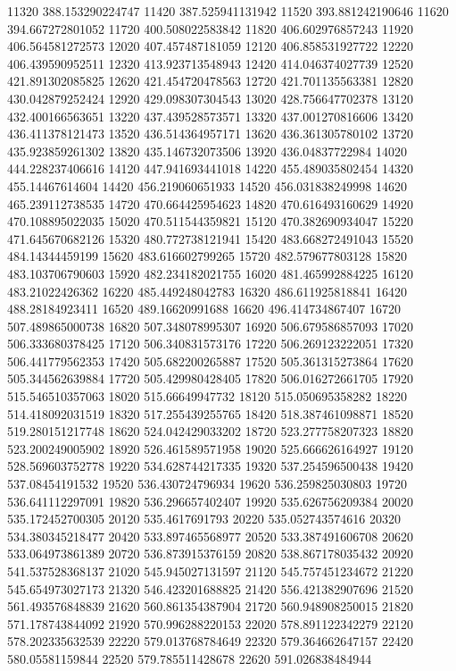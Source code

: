 {11320 388.153290224747
11420 387.525941131942
11520 393.881242190646
11620 394.667272801052
11720 400.508022583842
11820 406.602976857243
11920 406.564581272573
12020 407.457487181059
12120 406.858531927722
12220 406.439590952511
12320 413.923713548943
12420 414.046374027739
12520 421.891302085825
12620 421.454720478563
12720 421.701135563381
12820 430.042879252424
12920 429.098307304543
13020 428.756647702378
13120 432.400166563651
13220 437.439528573571
13320 437.001270816606
13420 436.411378121473
13520 436.514364957171
13620 436.361305780102
13720 435.923859261302
13820 435.146732073506
13920 436.04837722984
14020 444.228237406616
14120 447.941693441018
14220 455.489035802454
14320 455.14467614604
14420 456.219060651933
14520 456.031838249998
14620 465.239112738535
14720 470.664425954623
14820 470.616493160629
14920 470.108895022035
15020 470.511544359821
15120 470.382690934047
15220 471.645670682126
15320 480.772738121941
15420 483.668272491043
15520 484.14344459199
15620 483.616602799265
15720 482.579677803128
15820 483.103706790603
15920 482.234182021755
16020 481.465992884225
16120 483.21022426362
16220 485.449248042783
16320 486.611925818841
16420 488.28184923411
16520 489.16620991688
16620 496.414734867407
16720 507.489865000738
16820 507.348078995307
16920 506.679586857093
17020 506.333680378425
17120 506.340831573176
17220 506.269123222051
17320 506.441779562353
17420 505.682200265887
17520 505.361315273864
17620 505.344562639884
17720 505.429980428405
17820 506.016272661705
17920 515.546510357063
18020 515.66649947732
18120 515.050695358282
18220 514.418092031519
18320 517.255439255765
18420 518.387461098871
18520 519.280151217748
18620 524.042429033202
18720 523.277758207323
18820 523.200249005902
18920 526.461589571958
19020 525.666626164927
19120 528.569603752778
19220 534.628744217335
19320 537.254596500438
19420 537.08454191532
19520 536.430724796934
19620 536.259825030803
19720 536.641112297091
19820 536.296657402407
19920 535.626756209384
20020 535.172452700305
20120 535.4617691793
20220 535.052743574616
20320 534.380345218477
20420 533.897465568977
20520 533.387491606708
20620 533.064973861389
20720 536.873915376159
20820 538.867178035432
20920 541.537528368137
21020 545.945027131597
21120 545.757451234672
21220 545.654973027173
21320 546.423201688825
21420 556.421382907696
21520 561.493576848839
21620 560.861354387904
21720 560.948908250015
21820 571.178743844092
21920 570.996288220153
22020 578.891122342279
22120 578.202335632539
22220 579.013768784649
22320 579.364662647157
22420 580.05581159844
22520 579.785511428678
22620 591.026838484944
}
